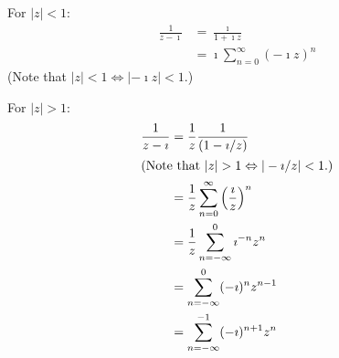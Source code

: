 {%


\begin{Solution}
  \label{solution laurent 1/(z-i)}
  For $|z| < 1$:
  \begin{align*}
    \frac{1}{z - \imath} 
    &= \frac{\imath}{1 + \imath z} 
    \\
    &= \imath \sum_{n=0}^\infty (- \imath z)^n
  \end{align*}
  (Note that $|z| <1 \Leftrightarrow |- \imath z| < 1$.)

  For $|z| > 1$:
  \begin{align*}
    \frac{1}{z - \imath} &= \frac{1}{z} \frac{1}{(1 - \imath / z)} 
    \\
    \intertext{(Note that $|z| > 1 \Leftrightarrow |- \imath / z| < 1$.)}
    &= \frac{1}{z} \sum_{n=0}^\infty \left( \frac{\imath}{z} \right)^n 
    \\
    &= \frac{1}{z} \sum_{n=-\infty}^0 \imath^{-n} z^n 
    \\
    &= \sum_{n=-\infty}^0 (-\imath)^n z^{n-1} 
    \\
    &= \sum_{n=-\infty}^{-1} (-\imath)^{n+1} z^n
  \end{align*}
\end{Solution}



}
